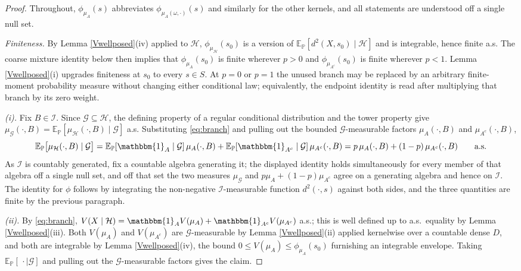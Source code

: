 \documentclass{article}
\newcommand{\E}{\mathbb{E}_{\mathbb{P}}}
\newcommand{\G}{\mathcal{G}}
\newcommand{\I}{\mathcal{I}}
\newcommand{\1}{\mathbbm{1}}
\begin{document}
\begin{proof}
Throughout, $\phi_{\mu_A}(s)$ abbreviates $\phi_{\mu_A(\omega,\cdot)}(s)$ and
similarly for the other kernels, and all statements are understood off a
single null set.
 
\emph{Finiteness.} By Lemma \ref{Vwellposed}(iv) applied to $\mathcal{H}$,
$\phi_{\mu_\mathcal{H}}(s_0)$ is a version of $\E[d^2(X,s_0)\mid\mathcal{H}]$
and is integrable, hence finite a.s. The coarse mixture identity below then implies that
$\phi_{\mu_A}(s_0)$ is finite wherever $p>0$ and
$\phi_{\mu_{A^c}}(s_0)$ is finite wherever $p<1$. Lemma \ref{Vwellposed}(i) upgrades finiteness at
$s_0$ to every $s\in S$. At $p=0$ or $p=1$ the unused branch may be replaced by an arbitrary
finite-moment probability measure without changing either conditional law; equivalently, the
endpoint identity is read after multiplying that branch by its zero weight.
 
\emph{(i).} Fix $B\in\I$. Since $\G\subseteq\mathcal{H}$, the defining property
of a regular conditional distribution and the tower property give
$\mu_\G(\cdot,B)=\E[\mu_\mathcal{H}(\cdot,B)\mid\G]$ a.s. Substituting
\eqref{eq:branch} and pulling out the bounded $\G$-measurable factors
$\mu_A(\cdot,B)$ and $\mu_{A^c}(\cdot,B)$,
\[
\E\big[\mu_\mathcal{H}(\cdot,B)\mid\G\big]
=\E[\1_A\mid\G]\,\mu_A(\cdot,B)+\E[\1_{A^c}\mid\G]\,\mu_{A^c}(\cdot,B)
=p\,\mu_A(\cdot,B)+(1-p)\,\mu_{A^c}(\cdot,B)
\qquad\text{a.s.}
\]
As $\I$ is countably generated, fix a countable algebra generating it; the
displayed identity holds simultaneously for every member of that algebra off a
single null set, and off that set the two measures $\mu_\G$ and
$p\mu_A+(1-p)\mu_{A^c}$ agree on a generating algebra and hence on $\I$. The
identity for $\phi$ follows by integrating the non-negative
$\I$-measurable function $d^2(\cdot,s)$ against both sides, and the three
quantities are finite by the previous paragraph.
 
\emph{(ii).} By \eqref{eq:branch}, $V(X\mid\mathcal{H})
=\1_A V(\mu_A)+\1_{A^c}V(\mu_{A^c})$ a.s.; this is well defined up to a.s.\
equality by Lemma \ref{Vwellposed}(iii). Both $V(\mu_A)$ and $V(\mu_{A^c})$ are
$\G$-measurable by Lemma \ref{Vwellposed}(ii) applied kernelwise over a
countable dense $D$, and both are integrable by Lemma \ref{Vwellposed}(iv), the
bound $0\le V(\mu_A)\le\phi_{\mu_A}(s_0)$ furnishing an integrable envelope.
Taking $\E[\,\cdot\mid\G]$ and pulling out the $\G$-measurable factors gives
the claim.
 

\end{proof}
\end{document}
